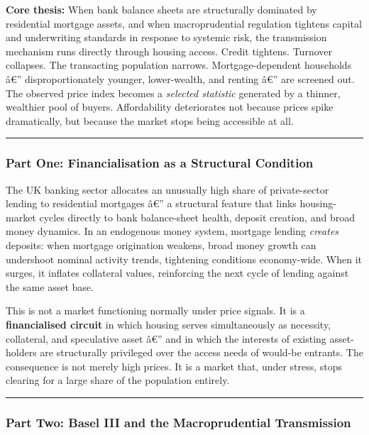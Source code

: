 \textbf{Core thesis:} When bank balance sheets are structurally
dominated by residential mortgage assets, and when macroprudential
regulation tightens capital and underwriting standards in response to
systemic risk, the transmission mechanism runs directly through housing
access. Credit tightens. Turnover collapses. The transacting population
narrows. Mortgage-dependent households â€'' disproportionately younger,
lower-wealth, and renting â€'' are screened out. The observed price
index becomes a \emph{selected statistic} generated by a thinner,
wealthier pool of buyers. Affordability deteriorates not because prices
spike dramatically, but because the market stops being accessible at
all.

\begin{center}\rule{0.5\linewidth}{0.5pt}\end{center}

\subsubsection{Part One: Financialisation as a Structural
Condition}\label{part-one-financialisation-as-a-structural-condition}

The UK banking sector allocates an unusually high share of
private-sector lending to residential mortgages â€'' a structural
feature that links housing-market cycles directly to bank balance-sheet
health, deposit creation, and broad money dynamics. In an endogenous
money system, mortgage lending \emph{creates} deposits: when mortgage
origination weakens, broad money growth can undershoot nominal activity
trends, tightening conditions economy-wide. When it surges, it inflates
collateral values, reinforcing the next cycle of lending against the
same asset base.

This is not a market functioning normally under price signals. It is a
\textbf{financialised circuit} in which housing serves simultaneously as
necessity, collateral, and speculative asset â€'' and in which the
interests of existing asset-holders are structurally privileged over the
access needs of would-be entrants. The consequence is not merely high
prices. It is a market that, under stress, stops clearing for a large
share of the population entirely.

\begin{center}\rule{0.5\linewidth}{0.5pt}\end{center}

\subsubsection{Part Two: Basel III and the Macroprudential
Transmission}\label{part-two-basel-iii-and-the-macroprudential-transmission}

